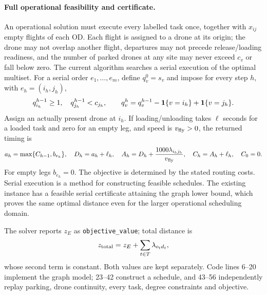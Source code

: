 \documentclass[11pt]{article}
\begin{document}
\paragraph{Full operational feasibility and certificate.}
An operational solution must execute every labelled task once, together with
$x_{ij}$ empty flights of each OD. Each flight is assigned to a drone at its
origin; the drone may not overlap another flight, departures may not precede
release/loading readiness, and the number of parked drones at any site may
never exceed $c_v$ or fall below zero. The current algorithm searches a serial
execution of the optimal multiset. For a serial order $e_1,\ldots,e_m$, define
$q_v^0=s_v$ and impose for every step $h$, with $e_h=(i_h,j_h)$,
\[
q_{i_h}^{h-1}\ge1,\quad q_{j_h}^{h-1}<c_{j_h},\qquad
q_v^h=q_v^{h-1}-{\bf1}\{v=i_h\}+{\bf1}\{v=j_h\}.
\]
Assign an actually present drone at $i_h$. If loading/unloading takes
$\ell$ seconds for a loaded task and zero for an empty leg, and speed is
$v_{\rm fly}>0$, the returned timing is
\[
a_h=\max\{C_{h-1},b_{e_h}\},\quad
D_h=a_h+\ell_h,\quad
A_h=D_h+\frac{1000\lambda_{i_hj_h}}{v_{\rm fly}},\quad
C_h=A_h+\ell_h,\quad C_0=0.
\]
For empty legs $b_{e_h}=0$. The objective is determined by the stated routing costs.
Serial execution is a method for constructing feasible schedules. The existing instance has a feasible serial
certificate attaining the graph lower bound, which proves the same optimal
distance even for the larger operational scheduling domain.

The solver reports $z_E$ as \texttt{objective\_value}; total distance is
\[
z_{\rm total}=z_E+\sum_{t\in T}\lambda_{o_td_t},
\]
whose second term is constant. Both values are kept separately.
Code lines 6--20 implement the graph model; 23--42 construct a schedule,
and 43--56 independently replay parking, drone continuity, every task,
degree constraints and objective.
\end{document}
